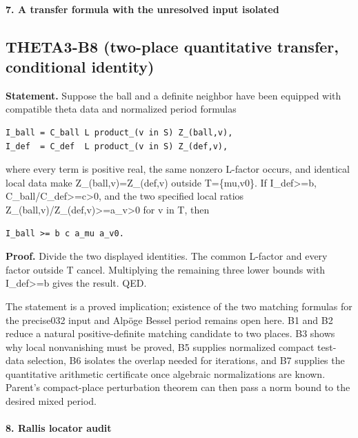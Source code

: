 \paragraph{7. A transfer formula with the unresolved input isolated}\label{a-transfer-formula-with-the-unresolved-input-isolated}

\subsection{THETA3-B8 (two-place quantitative transfer, conditional identity)}\label{theta3-b8-two-place-quantitative-transfer-conditional-identity}\label{B8}

\textbf{Statement.} Suppose the ball and a definite neighbor have been equipped with compatible theta data and normalized period formulas

\begin{verbatim}
I_ball = C_ball L product_(v in S) Z_(ball,v),
I_def  = C_def  L product_(v in S) Z_(def,v),
\end{verbatim}

where every term is positive real, the same nonzero L-factor occurs, and identical local data make Z\_(ball,v)=Z\_(def,v) outside T=\{mu,v0\}. If I\_def\textgreater=b, C\_ball/C\_def\textgreater=c\textgreater0, and the two specified local ratios Z\_(ball,v)/Z\_(def,v)\textgreater=a\_v\textgreater0 for v in T, then

\begin{verbatim}
I_ball >= b c a_mu a_v0.
\end{verbatim}

\textbf{Proof.} Divide the two displayed identities. The common L-factor and every factor outside T cancel. Multiplying the remaining three lower bounds with I\_def\textgreater=b gives the result. QED.

The statement is a proved implication; existence of the two matching formulas for the precise032 input and Alpöge Bessel period remains open here. B1 and B2 reduce a natural positive-definite matching candidate to two places. B3 shows why local nonvanishing must be proved, B5 supplies normalized compact test-data selection, B6 isolates the overlap needed for iterations, and B7 supplies the quantitative arithmetic certificate once algebraic normalizations are known. Parent's compact-place perturbation theorem can then pass a norm bound to the desired mixed period.

\paragraph{8. Rallis locator audit}\label{rallis-locator-audit}

